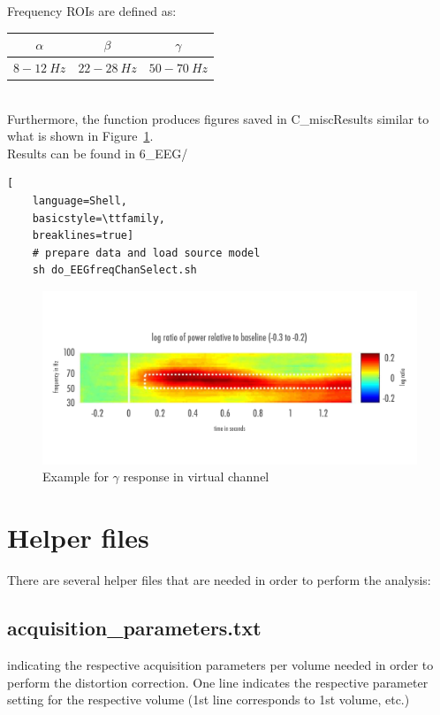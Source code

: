 \documentclass[12pt,a4paper]{scrartcl}
\begin{document}
\noindent Frequency ROIs are defined as:
\begin{table}[h]
\begin{tabular}{c | c | c}
\toprule
$\alpha$ & $\beta$ & $\gamma$\\\toprule
$8-12~Hz$ & $22-28~Hz$ & $50-70~Hz$ \\\bottomrule
\end{tabular}
\end{table}\\
Furthermore, the function produces figures saved in C\_miscResults similar to what is shown in Figure~\ref{fig:exampleGamma}.\\

\noindent Results can be found in 6\_EEG/\\
\begin{lstlisting}[
    language=Shell,
    basicstyle=\ttfamily,
    breaklines=true]
    # prepare data and load source model
    sh do_EEGfreqChanSelect.sh
\end{lstlisting}
\begin{figure}
\begin{center}
\includegraphics[width=1\textwidth]{exampleGamma}
\caption[Example for $\gamma$ response in virtual channel]{Example for $\gamma$ response in virtual channel}
\end{center}
\label{fig:exampleGamma}
\end{figure}
\FloatBarrier
\section{Helper files}
There are several helper files that are needed in order to perform the analysis:

\subsection{acquisition\_parameters.txt}
indicating the respective acquisition parameters per volume needed in order to perform the distortion correction. One line indicates the respective parameter setting for the respective volume (1st line corresponds to 1st volume, etc.)\\
\end{document}
